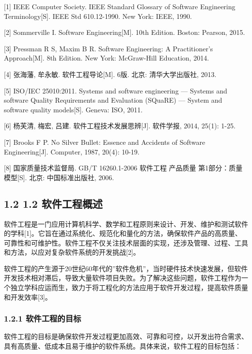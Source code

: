 \documentclass[12pt,a4paper]{article}
\begin{document}
{[}1{]} IEEE Computer Society. IEEE Standard Glossary of Software
Engineering Terminology{[}S{]}. IEEE Std 610.12-1990. New York: IEEE,
1990.

{[}2{]} Sommerville I. Software Engineering{[}M{]}. 10th Edition.
Boston: Pearson, 2015.

{[}3{]} Pressman R S, Maxim B R. Software Engineering: A Practitioner's
Approach{[}M{]}. 8th Edition. New York: McGraw-Hill Education, 2014.

{[}4{]} 张海藩, 牟永敏. 软件工程导论{[}M{]}. 6版. 北京: 清华大学出版社,
2013.

{[}5{]} ISO/IEC 25010:2011. Systems and software engineering --- Systems
and software Quality Requirements and Evaluation (SQuaRE) --- System and
software quality models{[}S{]}. Geneva: ISO, 2011.

{[}6{]} 杨芙清, 梅宏, 吕建. 软件工程技术发展思辨{[}J{]}. 软件学报, 2014,
25(1): 1-25.

{[}7{]} Brooks F P. No Silver Bullet: Essence and Accidents of Software
Engineering{[}J{]}. Computer, 1987, 20(4): 10-19.

{[}8{]} 国家质量技术监督局. GB/T 16260.1-2006 软件工程 产品质量
第1部分：质量模型{[}S{]}. 北京: 中国标准出版社, 2006.

\subsection{1.2 1.2
软件工程概述}\label{ux8f6fux4ef6ux5de5ux7a0bux6982ux8ff0}

软件工程是一门应用计算机科学、数学和工程原则来设计、开发、维护和测试软件的学科{[}1{]}。它旨在通过系统化、规范化和量化的方法，确保软件产品的高质量、可靠性和可维护性。软件工程不仅关注技术层面的实现，还涉及管理、过程、工具和方法，以应对复杂软件系统的开发挑战{[}2{]}。

软件工程的产生源于20世纪60年代的''软件危机''，当时硬件技术快速发展，但软件开发技术相对滞后，导致大量软件项目失败。为了解决这些问题，软件工程作为一个独立学科应运而生，致力于将工程化的方法应用于软件开发过程，提高软件质量和开发效率{[}3{]}。

\subsubsection{1.2.1
软件工程的目标}\label{ux8f6fux4ef6ux5de5ux7a0bux7684ux76eeux6807}

软件工程的目标是确保软件开发过程更加高效、可靠和可控，以开发出符合需求、具有高质量、低成本且易于维护的软件系统。具体来说，软件工程的目标包括：
\end{document}

